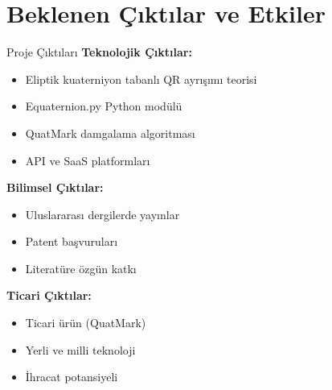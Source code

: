 \documentclass[aspectratio=169,xcolor={dvipsnames}]{beamer}
\begin{document}
\section{Beklenen Çıktılar ve Etkiler}

\begin{frame}{Proje Çıktıları}
\textbf{Teknolojik Çıktılar:}
\begin{itemize}
\item Eliptik kuaterniyon tabanlı QR ayrışımı teorisi
\item Equaternion.py Python modülü
\item QuatMark damgalama algoritması
\item API ve SaaS platformları
\end{itemize} %

\vspace{0.3cm}

\textbf{Bilimsel Çıktılar:}
\begin{itemize}
\item Uluslararası dergilerde yayınlar
\item Patent başvuruları
\item Literatüre özgün katkı
\end{itemize}

\vspace{0.3cm}

\textbf{Ticari Çıktılar:}
\begin{itemize}
\item Ticari ürün (QuatMark)
\item Yerli ve milli teknoloji
\item İhracat potansiyeli
\end{itemize}
\end{frame}
\end{document}
